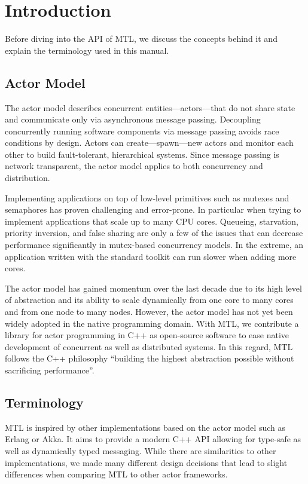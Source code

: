 \section{Introduction}

Before diving into the API of MTL, we discuss the concepts behind it and
explain the terminology used in this manual.

\subsection{Actor Model}

The actor model describes concurrent entities---actors---that do not share
state and communicate only via asynchronous message passing. Decoupling
concurrently running software components via message passing avoids race
conditions by design. Actors can create---spawn---new actors and monitor each
other to build fault-tolerant, hierarchical systems. Since message passing is
network transparent, the actor model applies to both concurrency and
distribution.

Implementing applications on top of low-level primitives such as mutexes and
semaphores has proven challenging and error-prone. In particular when trying to
implement applications that scale up to many CPU cores. Queueing, starvation,
priority inversion, and false sharing are only a few of the issues that can
decrease performance significantly in mutex-based concurrency models. In the
extreme, an application written with the standard toolkit can run slower when
adding more cores.

The actor model has gained momentum over the last decade due to its high level
of abstraction and its ability to scale dynamically from one core to many cores
and from one node to many nodes. However, the actor model has not yet been
widely adopted in the native programming domain. With MTL, we contribute a
library for actor programming in C++ as open-source software to ease native
development of concurrent as well as distributed systems. In this regard, MTL
follows the C++ philosophy ``building the highest abstraction possible without
sacrificing performance''.

\subsection{Terminology}

MTL is inspired by other implementations based on the actor model such as
Erlang or Akka. It aims to provide a modern C++ API allowing for type-safe as
well as dynamically typed messaging. While there are similarities to other
implementations, we made many different design decisions that lead to slight
differences when comparing MTL to other actor frameworks.


